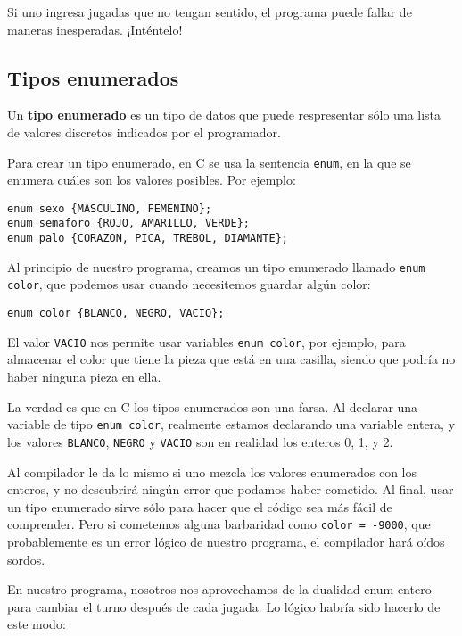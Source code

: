 Si uno ingresa jugadas que no tengan sentido, el programa puede fallar
de maneras inesperadas. ¡Inténtelo!

\subsection{Tipos enumerados}

Un \textbf{tipo enumerado} es un tipo de datos que puede respresentar
sólo una lista de valores discretos indicados por el programador.

Para crear un tipo enumerado, en C se usa la sentencia \lstinline!enum!,
en la que se enumera cuáles son los valores posibles. Por ejemplo:

\begin{lstlisting}
enum sexo {MASCULINO, FEMENINO};
enum semaforo {ROJO, AMARILLO, VERDE};
enum palo {CORAZON, PICA, TREBOL, DIAMANTE};
\end{lstlisting}

Al principio de nuestro programa, creamos un tipo enumerado llamado
\lstinline!enum color!, que podemos usar cuando necesitemos guardar
algún color:

\begin{lstlisting}
enum color {BLANCO, NEGRO, VACIO};
\end{lstlisting}

El valor \lstinline!VACIO! nos permite usar variables
\lstinline!enum color!, por ejemplo, para almacenar el color que tiene
la pieza que está en una casilla, siendo que podría no haber ninguna
pieza en ella.

La verdad es que en C los tipos enumerados son una farsa. Al declarar
una variable de tipo \lstinline!enum color!, realmente estamos
declarando una variable entera, y los valores \lstinline!BLANCO!,
\lstinline!NEGRO! y \lstinline!VACIO! son en realidad los enteros 0, 1,
y 2.

Al compilador le da lo mismo si uno mezcla los valores enumerados con
los enteros, y no descubrirá ningún error que podamos haber cometido. Al
final, usar un tipo enumerado sirve sólo para hacer que el código sea
más fácil de comprender. Pero si cometemos alguna barbaridad como
\lstinline!color = -9000!, que probablemente es un error lógico de
nuestro programa, el compilador hará oídos sordos.

En nuestro programa, nosotros nos aprovechamos de la dualidad
enum-entero para cambiar el turno después de cada jugada. Lo lógico
habría sido hacerlo de este modo:

